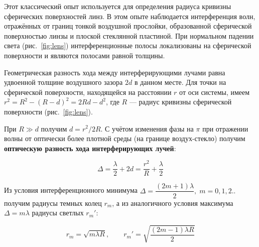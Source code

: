 \documentclass[a4paper,12pt]{extarticle}
\begin{document}
Этот классический опыт используется для определения радиуса кривизны сферических
поверхностей линз. В этом опыте наблюдается интерференция волн, отражённых от границ
тонкой воздушной прослойки, образованной сферической поверхностью линзы и плоской
стеклянной пластиной. При нормальном падении света (рис.~\ref{fig:lens})
интерференционные полосы локализованы на сферической поверхности и являются
полосами равной толщины.
	
Геометрическая разность хода между интерферирующими лучами равна удвоенной толщине
воздушного зазора $ 2d $ в данном месте. Для точки на сферической поверхности,
находящейся на расстоянии $ r $ от оси системы, имеем
$ r^2 = R^2 - {(R - d)}^2 = 2Rd - d^2 $, где $ R $ --- радиус кривизны сферической
поверхности (рис.~\ref{fig:lens}).
	
	При $R\gg d$ получим $d = r^2/2R$. С учётом изменения фазы на $\pi$ при отражении волны от оптически более плотной среды (на границе воздух-стекло) получим \textbf{оптическую разность хода интерферирующих лучей}:
	
\begin{equation}\label{r_m}
    \Delta = \dfrac{\lambda}{2} + 2d = \dfrac{r^2}{R} + \dfrac{\lambda}{2}
\end{equation}
	
Из условия интерференционного минимума
$ \Delta = \dfrac{(2m +1)\lambda}{2}, \; m =0, 1, 2.. $ получим радиусы темных
колец $ r_m $, а из аналогичного условия максимума $ \Delta = m \lambda $
радиусы светлых $r_m'$:
	
\begin{equation}\label{r_m'}
    r_m = \sqrt{m \lambda R}, \qquad r_m' = \sqrt{\dfrac{(2m-1) \lambda R}{2}}
\end{equation}
\end{document}
